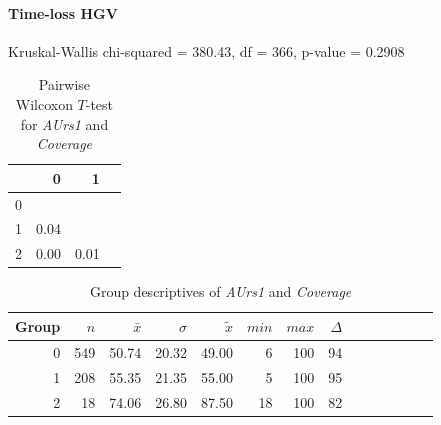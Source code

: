 \paragraph{Time-loss HGV}
Kruskal-Wallis chi-squared = 380.43, df = 366, p-value = 0.2908

\begin{table}[ht]
	\small
	\centering
    \begin{tabular}{rrrr}
        \toprule
        & 0 & 1 \\ 
        \midrule
        0 &  &  \\ 
        1 & 0.04 &  \\ 
        2 & 0.00 & 0.01 \\ 
        \bottomrule
      \end{tabular}
    \caption{Pairwise Wilcoxon $T$-test for \textit{AUrs1} and \textit{Coverage}}
    \label{tbl:wilcoxon_baysis_effector_AUrs1_Cov}
\end{table}
\begin{table}[ht]
	\small
	\centering
    \begin{tabular}{rrrrrrrrrrrrrr}
        \toprule
        Group & $n$ & $\bar{x}$ & $\sigma$ & $\tilde{x}$ & $min$ & $max$ & $\Delta$ \\
        \midrule
        0 & 549 & 50.74 & 20.32 & 49.00 & 6  & 100 & 94 \\ 
        1 & 208 & 55.35 & 21.35 & 55.00 & 5  & 100 & 95 \\ 
        2 & 18  & 74.06 & 26.80 & 87.50 & 18 & 100 & 82 \\ 
        \bottomrule
      \end{tabular}
    \caption{Group descriptives of \textit{AUrs1} and \textit{Coverage}}
    \label{tbl:descriptives_baysis_effector_AUrs1_Cov}
\end{table}